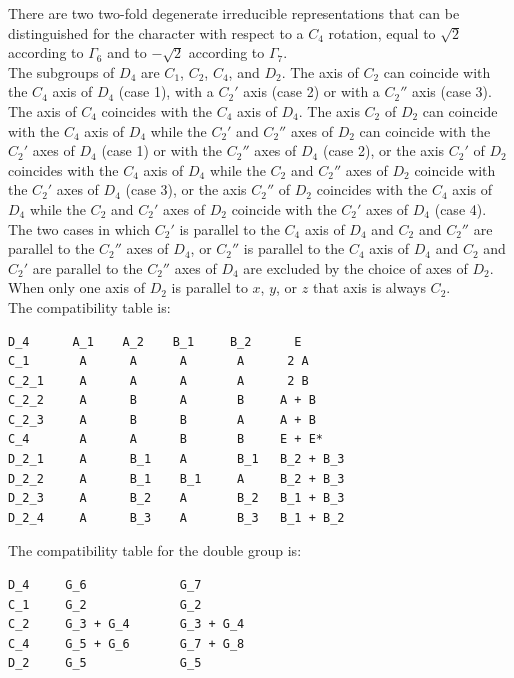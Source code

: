 \documentclass[12pt,a4paper]{article}
\begin{document}
There are two two-fold degenerate irreducible representations that can be 
distinguished for the character with respect to a $C_4$ rotation, equal
to $\sqrt{2}$ according to $\Gamma_6$ and to $-\sqrt{2}$ according to $\Gamma_7$. \\
The subgroups of $D_4$ are $C_1$, $C_2$, $C_4$, and $D_2$. 
The axis of $C_2$ can coincide with the $C_4$ axis of $D_4$ (case 1), 
with a $C_2'$ axis (case 2) or with a $C_2''$ axis (case 3). 
The axis of $C_4$ coincides with the $C_4$ axis of $D_4$.
The axis $C_2$ of $D_2$ can coincide with the $C_4$ axis
of $D_4$ while the $C_2'$ and $C_2''$ axes of $D_2$ can coincide with the $C_2'$
axes of $D_4$ (case 1) or with the $C_2''$ axes of $D_4$ (case 2), 
or the axis $C_2'$ of $D_2$ coincides with the $C_4$ axis
of $D_4$ while the $C_2$ and $C_2''$ axes of $D_2$ coincide with the $C_2'$
axes of $D_4$ (case 3), or the axis $C_2''$ of $D_2$ coincides with the $C_4$ axis
of $D_4$ while the $C_2$ and $C_2'$ axes of $D_2$ coincide with the $C_2'$
axes of $D_4$ (case 4). The two cases in which $C_2'$ is parallel to the
$C_4$ axis of $D_4$ and $C_2$ and $C_2''$ are parallel to the $C_2''$ axes of
$D_4$, or $C_2''$ is parallel to the $C_4$ axis of $D_4$ and
$C_2$ and $C_2'$ are parallel to the $C_2''$ axes of $D_4$ are 
excluded by the choice of axes of $D_2$. When only one axis of $D_2$
is parallel to $x$, $y$, or $z$ that axis is always $C_2$. \\
The compatibility table is:
\begin{verbatim}
D_4      A_1    A_2    B_1     B_2      E
C_1       A      A      A       A      2 A
C_2_1     A      A      A       A      2 B
C_2_2     A      B      A       B     A + B
C_2_3     A      B      B       A     A + B
C_4       A      A      B       B     E + E*      
D_2_1     A      B_1    A       B_1   B_2 + B_3
D_2_2     A      B_1    B_1     A     B_2 + B_3
D_2_3     A      B_2    A       B_2   B_1 + B_3
D_2_4     A      B_3    A       B_3   B_1 + B_2
\end{verbatim}
The compatibility table for the double group is:
\begin{verbatim}
D_4     G_6             G_7  
C_1     G_2             G_2   
C_2     G_3 + G_4       G_3 + G_4   
C_4     G_5 + G_6       G_7 + G_8
D_2     G_5             G_5
\end{verbatim}
\end{document}
